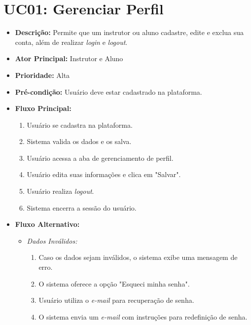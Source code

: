         \section*{UC01: Gerenciar Perfil}

        \begin{itemize}
            \item \textbf{Descrição:} Permite que um instrutor ou aluno cadastre, edite e exclua sua conta, além de realizar \textit{login} e \textit{logout}.
            
            \item \textbf{Ator Principal:} Instrutor e Aluno
            
            \item \textbf{Prioridade:} Alta
            
            \item \textbf{Pré-condição:} Usuário deve estar cadastrado na plataforma.
            
            \item \textbf{Fluxo Principal:}
            \begin{enumerate}
                \item Usuário se cadastra na plataforma.
                \item Sistema valida os dados e os salva.
                \item Usuário acessa a aba de gerenciamento de perfil.
                \item Usuário edita suas informações e clica em "Salvar".
                \item Usuário realiza \textit{logout}.
                \item Sistema encerra a sessão do usuário.
            \end{enumerate}

            \item \textbf{Fluxo Alternativo:}
            \begin{itemize}
                \item \textit{Dados Inválidos:}
                \begin{enumerate}
                    \item Caso os dados sejam inválidos, o sistema exibe uma mensagem de erro.
                    \item O sistema oferece a opção "Esqueci minha senha".
                    \item Usuário utiliza o \textit{e-mail} para recuperação de senha.
                    \item O sistema envia um \textit{e-mail} com instruções para redefinição de senha.
                \end{enumerate}
            \end{itemize}
        \end{itemize}

